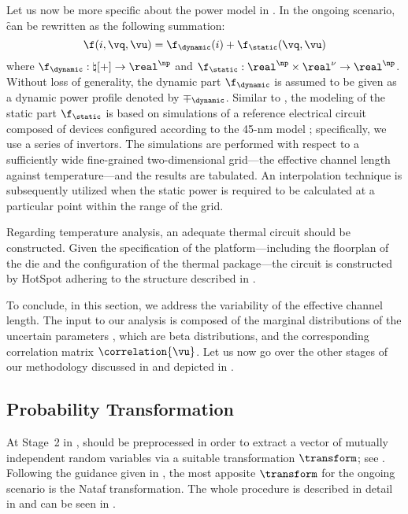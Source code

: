 Let us now be more specific about the power model in .
In the ongoing scenario, \f can be rewritten as the following summation:
\[
  \f(i, \vq, \vu) = \f_\dynamic(i) + \f_\static(\vq, \vu)
\]
where $\f_\dynamic: \natural[+] \to \real^\np$ and $\f_\static: \real^\np \times
\real^\nu \to \real^\np$. Without loss of generality, the dynamic part
$\f_\dynamic$ is assumed to be given as a dynamic power profile denoted by
$\mp_\dynamic$. Similar to , the modeling of the static
part $\f_\static$ is based on  simulations of a reference electrical
circuit composed of  devices \cite{bsim} configured according to the
45-nm   model \cite{ptm}; specifically, we use a series of
 invertors. The simulations are performed with respect to a
sufficiently wide fine-grained two-dimensional grid---the effective channel
length against temperature---and the results are tabulated. An interpolation
technique is subsequently utilized when the static power is required to be
calculated at a particular point within the range of the grid.

Regarding temperature analysis, an adequate thermal  circuit should be
constructed. Given the specification of the platform---including the floorplan
of the die and the configuration of the thermal package---the circuit is
constructed by HotSpot \cite{skadron2003} adhering to the structure described in
.

To conclude, in this section, we address the variability of the effective
channel length. The input to our analysis is composed of the marginal
distributions of the uncertain parameters \vu, which are beta distributions, and
the corresponding correlation matrix $\correlation{\vu}$. Let us now go over the
other stages of our methodology discussed in 
and depicted in .

\subsection{Probability Transformation}

At Stage~2 in , \vu should be preprocessed in order to
extract a vector of mutually independent random variables \vz via a suitable
transformation $\transform$; see . Following the
guidance given in , the most apposite $\transform$
for the ongoing scenario is the Nataf transformation. The whole procedure is
described in detail in  and can be seen in
.

